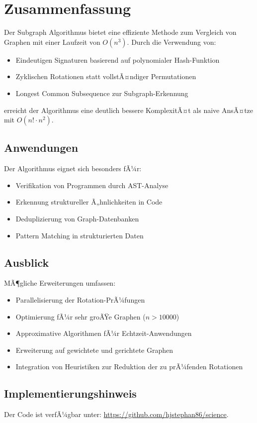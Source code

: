 ﻿\documentclass[a4paper,12pt]{article}
\theoremstyle{definition}
\begin{document}
\section{Zusammenfassung}

Der Subgraph Algorithmus bietet eine effiziente Methode zum Vergleich von Graphen mit einer Laufzeit von $O(n^3)$. Durch die Verwendung von:

\begin{itemize}
	\item Eindeutigen Signaturen basierend auf polynomialer Hash-Funktion
	\item Zyklischen Rotationen statt vollstÃ¤ndiger Permutationen
	\item Longest Common Subsequence zur Subgraph-Erkennung
\end{itemize}

erreicht der Algorithmus eine deutlich bessere KomplexitÃ¤t als naive AnsÃ¤tze mit $O(n! \cdot n^2)$.

\subsection{Anwendungen}

Der Algorithmus eignet sich besonders fÃ¼r:
\begin{itemize}
	\item Verifikation von Programmen durch AST-Analyse
	\item Erkennung struktureller Ã„hnlichkeiten in Code
	\item Deduplizierung von Graph-Datenbanken
	\item Pattern Matching in strukturierten Daten
\end{itemize}

\subsection{Ausblick}

MÃ¶gliche Erweiterungen umfassen:
\begin{itemize}
	\item Parallelisierung der Rotation-PrÃ¼fungen
	\item Optimierung fÃ¼r sehr groÃŸe Graphen ($n > 10000$)
	\item Approximative Algorithmen fÃ¼r Echtzeit-Anwendungen
	\item Erweiterung auf gewichtete und gerichtete Graphen
	\item Integration von Heuristiken zur Reduktion der zu prÃ¼fenden Rotationen
\end{itemize}

\subsection{Implementierungshinweis}

Der Code ist verfÃ¼gbar unter: \url{https://github.com/hjstephan86/science}.
\end{document}
